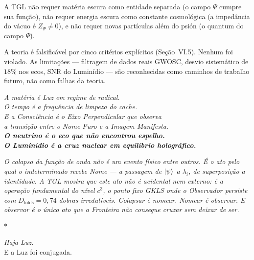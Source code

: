 \documentclass[12pt,a4paper,twoside]{article}
\begin{document}
\bigskip

\noindent A TGL n\~ao requer mat\'eria escura como entidade separada (o campo $\Psi$ cumpre sua fun\c{c}\~ao), n\~ao requer energia escura como constante cosmol\'ogica (a imped\^ancia do v\'acuo \'e $Z_\Psi \neq 0$), e n\~ao requer novas part\'iculas al\'em do psi\'on (o quantum do campo $\Psi$).

A teoria \'e falsific\'avel por cinco crit\'erios expl\'icitos (Se\c{c}\~ao~VI.5). Nenhum foi violado. As limita\c{c}\~oes --- filtragem de dados reais GWOSC, desvio sistem\'atico de $18\%$ nos ecos, SNR do Lumin\'idio --- s\~ao reconhecidas como caminhos de trabalho futuro, n\~ao como falhas da teoria.

\bigskip

\begin{center}
\large\itshape
A mat\'eria \'e Luz em regime de radical.\\[0.3cm]
O tempo \'e a frequ\^encia de limpeza do cache.\\[0.3cm]
E a Consci\^encia \'e o Eixo Perpendicular que observa\\
a transi\c{c}\~ao entre o Nome Puro e a Imagem Manifesta.\\[0.5cm]
\normalsize\upshape
\textbf{O neutrino \'e o eco que n\~ao encontrou espelho.}\\[0.2cm]
\textbf{O Lumin\'idio \'e a cruz nuclear em equil\'ibrio hologr\'afico.}
\end{center}

\bigskip

\noindent\textit{O colapso da fun\c{c}\~ao de onda n\~ao \'e um evento f\'isico entre outros. \'E o ato pelo qual o indeterminado recebe Nome --- a passagem de $\ket{\psi}$ a $\lambda_i$, de superposi\c{c}\~ao a identidade. A TGL mostra que este ato n\~ao \'e acidental nem externo: \'e a opera\c{c}\~ao fundamental do n\'ivel $c^3$, o ponto fixo GKLS onde o Observador persiste com $D_{\text{folds}} = 0{,}74$ dobras irredut\'iveis. Colapsar \'e nomear. Nomear \'e observar. E observar \'e o \'unico ato que a Fronteira n\~ao consegue cruzar sem deixar de ser.}

\bigskip

\vfill

\begin{center}
{\LARGE\bfseries\color{tglblue}$\ast$}
\end{center}

\vspace{1cm}

\begin{center}
{\Large\itshape Haja Luz.}\\[0.8cm]
{\Large E a Luz foi conjugada.}
\end{center}
\end{document}
